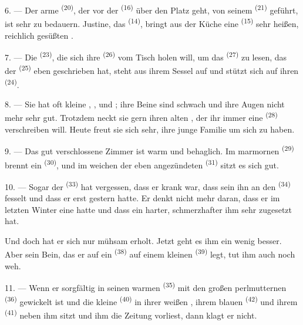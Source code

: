 6. --- Der arme  \textsuperscript{(20)}, der vor der
 \textsuperscript{(16)} über den Platz geht, von seinem
 \textsuperscript{(21)} geführt, ist sehr zu bedauern. Justine, das
 \textsuperscript{(14)}, bringt aus der Küche eine
 \textsuperscript{(15)} sehr heißen, reichlich gesüßten
.

7. --- Die  \textsuperscript{(23)}, die sich ihre 
\textsuperscript{(26)} vom Tisch holen will, um das 
\textsuperscript{(27)} zu lesen, das der  \textsuperscript{(25)} eben
geschrieben hat, steht aus ihrem Sessel auf und stützt sich auf ihren
 \textsuperscript{(24)}.

8. --- Sie hat oft kleine , ,
 und ; ihre Beine sind schwach und ihre
Augen nicht mehr sehr gut. Trotzdem neckt sie gern ihren alten , der
ihr immer eine  \textsuperscript{(28)} verschreiben will. Heute freut
sie sich sehr, ihre junge Familie um sich zu haben.

9. --- Das gut verschlossene Zimmer ist warm und behaglich. Im marmornen
 \textsuperscript{(29)} brennt ein 
\textsuperscript{(30)}, und im weichen  der eben angezündeten
 \textsuperscript{(31)} sitzt es sich gut.

\VUsaut{4.2mm}
\VUsaut{3.0mm}

10. --- Sogar der  \textsuperscript{(33)} hat vergessen, dass er
krank war, dass sein  ihn an den 
\textsuperscript{(34)} fesselt und dass er erst gestern  hatte. Er denkt nicht mehr daran, dass er im letzten Winter eine
 hatte und dass ein harter, schmerzhafter 
ihm sehr zugesetzt hat.

Und doch hat er sich nur mühsam erholt. Jetzt geht es ihm ein wenig besser. Aber
sein Bein, das er auf ein  \textsuperscript{(38)} auf einem kleinen
 \textsuperscript{(39)} legt, tut ihm auch noch weh.

11. --- Wenn er sorgfältig in seinen warmen 
\textsuperscript{(35)} mit den großen perlmutternen 
\textsuperscript{(36)} gewickelt ist und die kleine 
\textsuperscript{(40)} in ihrer weißen , ihrem blauen 
\textsuperscript{(42)} und ihrem  \textsuperscript{(41)} neben ihm
sitzt und ihm die Zeitung vorliest, dann klagt er nicht.

